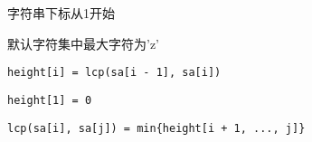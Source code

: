 字符串下标从1开始

默认字符集中最大字符为'z'

\verb|height[i] = lcp(sa[i - 1], sa[i])|

\verb|height[1] = 0|

\verb|lcp(sa[i], sa[j]) = min{height[i + 1, ..., j]}|